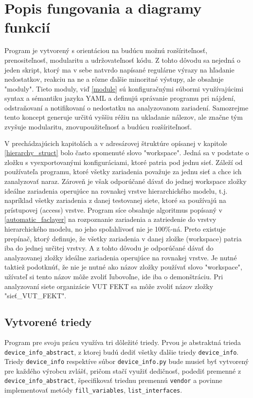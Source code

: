 \section{Popis fungovania a diagramy funkcií}
Program je vytvorený s orientáciou na budúcu možnú rozšíriteľnosť, prenositeľnosť, modularitu a udržovateľnosť kódu. Z tohto dôvodu sa nejedná o jeden skript, ktorý ma v sebe natvrdo napísané regulárne výrazy na hľadanie nedostatkov, reakciu na ne a rôzne ďalšie minoritné výstupy, ale obsahuje "moduly". Tieto moduly, viď \ref{module} sú konfiguračnými súbormi využívajúcimi syntax a sémantiku jazyka YAML a definujú správanie programu pri nájdení, odstraňovaní a notifikovaní o nedostatku na analyzovanom zariadení. Samozrejme tento koncept generuje určitú vyššiu réžiu na ukladanie nálezov, ale značne tým zvyšuje modularitu, znovupoužiteľnosť a budúcu rozšíriteľnosť.

V prechádzajúcich kapitolách a v adresárovej štruktúre opísanej v kapitole \ref{hierarchy_struct} bolo často spomenuté slovo "workspace". Jedná sa v podstate o zložku s vyexportovanými konfiguráciami, ktoré patria pod jednu sieť. Záleží od používateľa programu, ktoré všetky zariadenia považuje za jednu sieť a chce ich zanalyzovať naraz. Zároveň je však odporúčané dávať do jednej workspace zložky ideálne zariadenia operujúce na rovnakej vrstve hierarchického modelu, t.j. napríklad všetky zariadenia z danej testovanej siete, ktoré sa používajú na prístupovej (access) vrstve. Program síce obsahuje algoritmus popísaný v \ref{automatic_faclayer} na rozpoznanie zariadenia a zatriedenie do vrstvy hierarchického modelu, no jeho spoľahlivosť nie je 100\%-ná. Preto existuje prepínač, ktorý definuje, že všetky zariadenia v danej zložke (workspace) patria iba do jednej určitej vrstvy. A z tohto dôvodu je odporúčané dávať do analyzovanej zložky ideálne zariadenia operujúce na rovnakej vrstve. Je nutné taktiež podotknúť, že nie je nutné ako názov zložky používať slovo "workspace", užívateľ si tento názov môže zvoliť ľubovoľne, ide iba o demonštráciu. Pri analyzovaní siete organizácie VUT FEKT sa môže zvoliť názov zložky "sieť\_VUT\_FEKT".

\subsection{Vytvorené triedy}
Program pre svoju prácu využíva tri dôležité triedy. Prvou je abstraktná trieda \texttt{device\_info\_abstract}, z ktorej budú dediť všetky ďalšie triedy \texttt{device\_info}. Triedy \texttt{device\_info} respektíve súbor \texttt{device\_info.py} bude musieť byť vytvorený pre každého výrobcu zvlášť, pričom stačí využiť dedičnosť, podediť premenné z \texttt{device\_info\_abstract}, špecifikovať triednu premennú \texttt{vendor} a povinne implementovať metódy \texttt{fill\_variables}, \texttt{list\_interfaces}.


